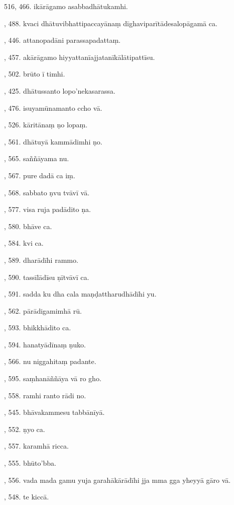 516, 466. ikārāgamo asabbadhātukamhi.\par {}, 488. kvaci dhātuvibhattipaccayānaṃ dīghaviparītādesalopāgamā ca.\par {}, 446. attanopadāni parassapadattaṃ.\par {}, 457. akārāgamo hiyyattanīajjatanīkālātipattīsu.\par {}, 502. brūto ī timhi.\par {}, 425. dhātussanto lopo’nekasarassa.\par {}, 476. isuyamūnamanto ccho vā.\par {}, 526. kāritānaṃ ṇo lopaṃ.\par {}, 561. dhātuyā kammādimhi ṇo.\par {}, 565. saññāyama nu.\par {}, 567. pure dadā ca iṃ.\par {}, 568. sabbato ṇvu tvāvī vā.\par {}, 577. visa ruja padādito ṇa.\par {}, 580. bhāve ca.\par {}, 584. kvi ca.\par {}, 589. dharādīhi rammo.\par {}, 590. tassīlādīsu ṇītvāvī ca.\par {}, 591. sadda ku dha cala maṇḍattharudhādīhi yu.\par {}, 562. pārādigamimhā rū.\par {}, 593. bhikkhādito ca.\par {}, 594. hanatyādīnaṃ ṇuko.\par {}, 566. nu niggahitaṃ padante.\par {}, 595. saṃhanāññāya vā ro gho.\par {}, 558. ramhi ranto rādi no.\par {}, 545. bhāvakammesu tabbānīyā.\par {}, 552. ṇyo ca.\par {}, 557. karamhā ricca.\par {}, 555. bhūto’bba.\par {}, 556. vada mada gamu yuja garahākārādīhi jja mma gga yheyyā gāro vā.\par {}, 548. te kiccā.\par \noindent
